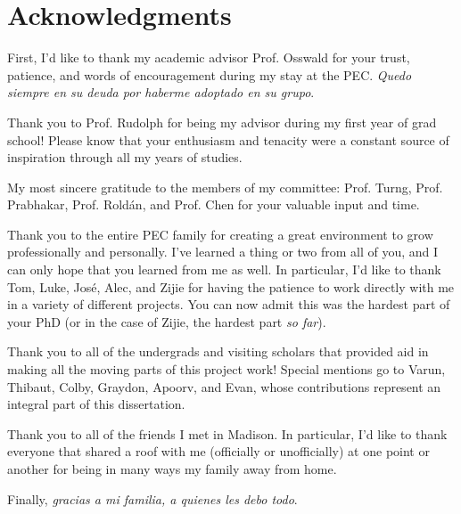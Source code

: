 \documentclass[main.tex]{subfiles}
\begin{document}
\chapter*{Acknowledgments}
{
\setlength{\parindent}{0cm}
\setlength{\parskip}{12pt}

First, I'd like to thank my academic advisor Prof. Osswald for your trust,  patience, and words of encouragement during my stay at the PEC. \emph{Quedo siempre en su deuda por haberme adoptado en su grupo}.

Thank you to Prof. Rudolph for being my advisor during my first year of grad school! Please know that your enthusiasm and tenacity were a constant source of inspiration through all my years of studies. 

My most sincere gratitude to the members of my committee: Prof. Turng, Prof. Prabhakar, Prof. Rold\'an, and Prof. Chen for your valuable input and time.

Thank you to the entire PEC family for creating a great environment to grow professionally and personally. I've learned a thing or two from all of you, and I can only hope that you learned from me as well. In particular, I'd like to thank Tom, Luke, Jos\'e, Alec, and Zijie for having the patience to work directly with me in a variety of different projects. You can now admit this was the hardest part of your PhD (or in the case of Zijie, the hardest part \emph{so far}).

Thank you to all of the undergrads and visiting scholars that provided aid in making all the moving parts of this project work! Special mentions go to Varun, Thibaut, Colby, Graydon, Apoorv, and Evan, whose contributions represent an integral part of this dissertation.

Thank you to all of the friends I met in Madison. In particular, I'd like to thank everyone that shared a roof with me (officially or unofficially) at one point or another for being in many ways my family away from home. 

Finally, \emph{gracias a mi familia, a quienes les debo todo}. 

}
\end{document}
